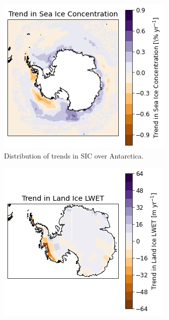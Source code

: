 \documentclass[../main.tex]{subfiles}
\begin{document}
\begin{figure}[H]
\centering
\begin{subfigure}[h!]{0.49\textwidth}
\includegraphics[width=\textwidth]{images/week8/lres/trend_sic_distribution}
\caption{Distribution of trends in SIC over Antarctica.}
\end{subfigure}
\begin{subfigure}[h!]{0.49\textwidth}
\includegraphics[width=\textwidth]{images/week8/lres/trend_lic_distribution}

\end{subfigure}
\end{figure}
\end{document}
